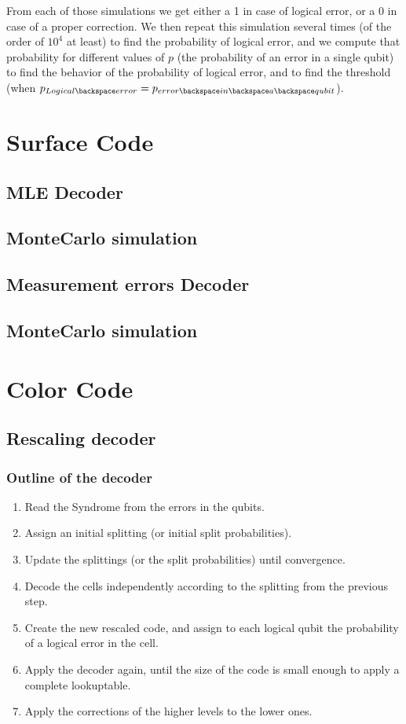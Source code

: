 \documentclass[a4paper,12pt]{article}
\begin{document}
From each of those simulations we get either a 1 in case of logical error, or a 0 in case of a proper correction. We then repeat this simulation several times (of the order of $10^4$ at least) to find the probability of logical error, and we compute that probability for different values of $p$ (the probability of an error in a single qubit) to find the behavior of the probability of logical error, and to find the threshold (when $p_{Logical\backspace error}=p_{error\backspace in \backspace a \backspace qubit}$).


\section{Surface Code}
\subsection{MLE Decoder}
\subsection{MonteCarlo simulation}
\subsection{Measurement errors Decoder}
\subsection{MonteCarlo simulation}

\section{Color Code}
\subsection{Rescaling decoder}
\subsubsection{Outline of the decoder}

\begin{enumerate}
\item Read the Syndrome from the errors in the qubits.
\item Assign an initial splitting (or initial split probabilities).
\item Update the splittings (or the split probabilities) until convergence.
\item Decode the cells independently according to the splitting from the previous step.
\item Create the new rescaled code, and assign to each logical qubit the probability of a logical error in the cell.
\item Apply the decoder again, until the size of the code is small enough to apply a complete lookuptable.
\item Apply the corrections of the higher levels to the lower ones.


\end{enumerate}
\end{document}
